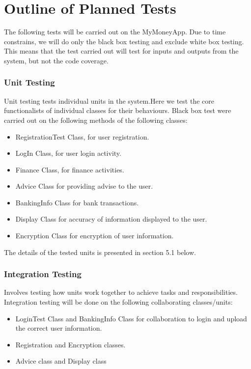 \documentclass{article}
\begin{document}
\newpage

\section{Outline of Planned Tests}
The following tests will be carried out on the MyMoneyApp. Due to time constrains, we will do only the black box testing and exclude white box testing. This means that the test carried out will test for inputs and outputs from the system, but not the code coverage.

\subsubsection{Unit Testing}
Unit testing tests individual units in the system.Here we test the core functionalists of individual classes for their behaviours. Black box test were carried out on the following methods of the following classes:
\begin{itemize}
\item RegistrationTest Class, for user registration.
    \item LogIn Class, for user login activity.
    \item Finance Class, for finance activities.
    \item Advice Class for providing advise to the user.
    \item BankingInfo Class for bank transactions.
    \item Display Class for accuracy of information displayed to the user.
    \item Encryption Class for encryption of user information.
    
\end{itemize}
The details of the tested units is presented in section 5.1 below.


\subsubsection{Integration Testing}
Involves testing how units work together to achieve tasks and responsibilities. Integration testing will be done on the following collaborating classes/units:

\begin{itemize}
    \item LoginTest Class and BankingInfo Class for collaboration to login and upload the correct user information.
    \item Registration and Encryption classes.
    \item Advice class and Display class  
\end{itemize}
\end{document}
